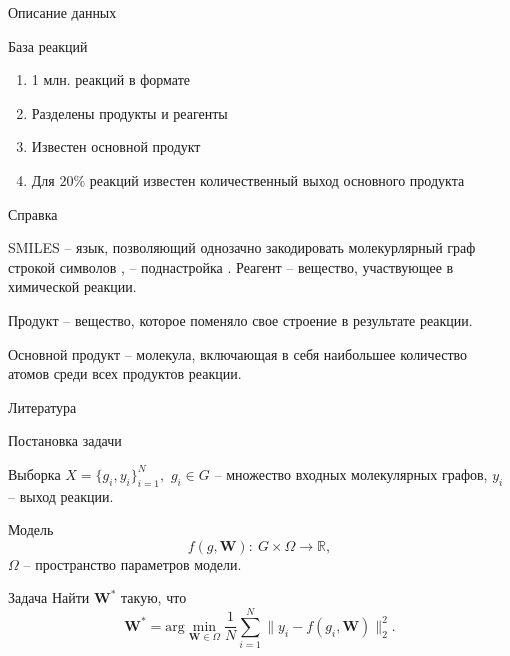 \documentclass[11pt,pdf,hyperref={unicode}]{beamer}
\begin{document}
\begin{frame}{Описание данных}
\begin{block}{База реакций}
\begin{enumerate}
    \item 1 млн. реакций в формате 
    \item Разделены продукты и реагенты
    \item Известен основной продукт
    \item Для $20\%$ реакций известен количественный выход основного продукта
\end{enumerate}
\end{block}
\begin{alertblock}{Справка}
\footnotesize{
\alert{SMILES} -- язык, позволяющий однозачно закодировать молекурлярный граф строкой символов ,  -- поднастройка .
\alert{Реагент} -- вещество, участвующее в химической реакции.

\alert{Продукт} -- вещество, которое поменяло свое строение в результате реакции.

\alert{Основной продукт} -- молекула, включающая в себя наибольшее количество атомов среди всех продуктов реакции.

}
\end{alertblock}
\end{frame}


\begin{frame}{Литература}
    
    \nocite{*}
     
\end{frame}





\begin{frame}{Постановка задачи}

\begin{block}{Выборка}
$X = \{g_i, y_i\}_{i = 1}^N,$ $g_i \in G$ -- множество входных молекулярных графов, $y_i$ -- выход реакции.
\end{block}
\begin{block}{Модель}
$$
f(g, \mathbf{W}):~G\times \Omega \rightarrow \mathbb{R},
$$
$\Omega$ -- пространство параметров модели.
\end{block}
\begin{block}{Задача}
Найти $\mathbf{W}^*$ такую, что 
$$
\mathbf{W^*} = \text{arg}\min_{\mathbf{W} \in \Omega}\dfrac{1}{N}\sum_{i = 1}^N \|y_i - f(g_i, \mathbf{W})\|_2^2.
$$
\end{block}

    
\end{frame}
\end{document}
